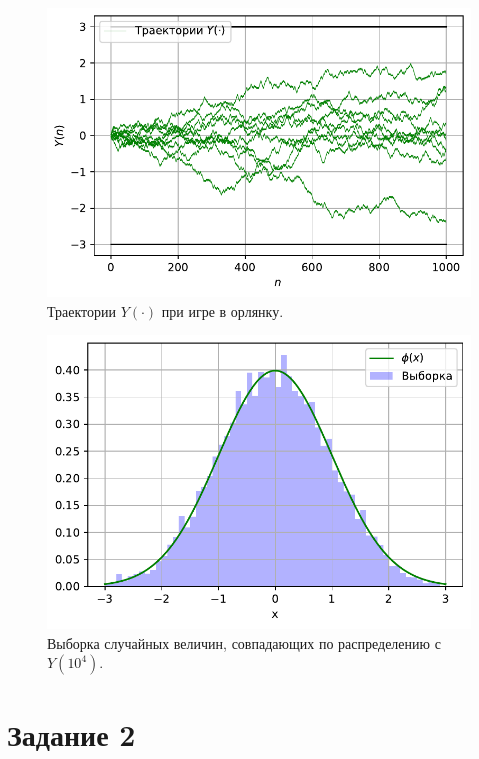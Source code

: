 \documentclass[16pt]{article}
\newcommand\A{(\cdot)}
\begin{document}
\begin{figure}[h]
	\center
    \includegraphics[scale=0.7]{1_4.pdf}
    \caption{Траектории $Y\A$ при игре в орлянку.}
\end{figure}

\begin{figure}[h]
	\center
    \includegraphics[scale=0.7]{1_5.pdf}
    \caption{Выборка случайных величин, совпадающих по распределению с $Y(10^4)$.}
\end{figure}

\newpage
\section{Задание 2}
\end{document}

